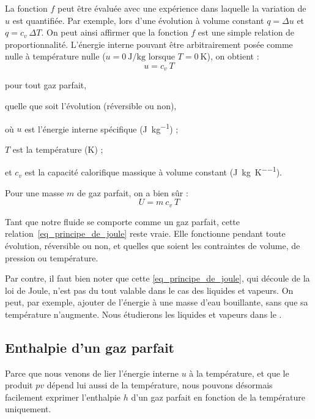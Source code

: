 		La fonction $f$ peut être évaluée avec une expérience dans laquelle la variation de~$u$ est quantifiée. Par exemple, lors d’une évolution à volume constant $q = \Delta u$ et $q = c_v \ \Delta T$. On peut ainsi affirmer que la fonction $f$ est une simple relation de proportionnalité. L’énergie interne pouvant être arbitrairement posée comme nulle à température nulle ($u = \SI{0}{\joule\per\kilogram}$ lorsque $T = \SI{0}{\kelvin}$), on obtient :
		\begin{equation}
			u = c_v \ T
			\label{eq_principe_de_joule}
		\end{equation}

		\begin{equationterms}
			\item pour tout gaz parfait,
			\item quelle que soit l’évolution (réversible ou non),
			\item où \tab $u$ 	\tab est l’énergie interne spécifique (\si{\joule\per\kilogram}) ;
			\item 	\tab $T$ 	\tab est la température (\si{\kelvin}) ;
			\item et \tab $c_v$ 	\tab est la capacité calorifique massique à volume constant (\si{\joule\per\kilogram\per\kelvin}).
		\end{equationterms}

		Pour une masse $m$ de gaz parfait, on a bien sûr :
		\begin{equation}
			U = m \ c_v \ T
		\end{equation}

		Tant que notre fluide se comporte comme un gaz parfait, cette relation~\ref{eq_principe_de_joule} reste vraie. Elle fonctionne pendant toute évolution, réversible ou non, et quelles que soient les contraintes de volume, de pression ou température.

		Par contre, il faut bien noter que cette \cref{eq_principe_de_joule}, qui découle de la loi de Joule, n’est pas du tout valable dans le cas des liquides et vapeurs. On peut, par exemple, ajouter de l’énergie à une masse d’eau bouillante, sans que sa température n’augmente. Nous étudierons les liquides et vapeurs dans le \courscinqshort.



	\subsection{Enthalpie d’un gaz parfait}

		Parce que nous venons de lier l’énergie interne $u$ à la température, et que le produit $p v$ dépend lui aussi de la température, nous pouvons désormais facilement exprimer l’enthalpie $h$ d’un gaz parfait en fonction de la température uniquement.

